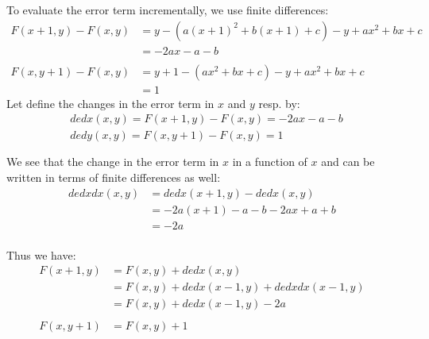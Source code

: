 \documentclass[a4paper,10pt]{article}
\begin{document}
\bigskip \noindent
To evaluate the error term incrementally, we use finite differences:
\begin{equation}
\left.\begin{aligned}
	F(x + 1, y) - F(x, y)
	&= y - (a(x + 1)^2 + b(x + 1) + c) - y + ax^2 + bx + c& \\
	&= -2ax - a - b& \\\\
	F(x, y + 1) - F(x, y)
	&= y + 1 - (ax^2 + bx + c) - y + ax^2 + bx + c& \\
	&= 1&
\end{aligned}\right.
\end{equation}
\newpage \noindent
Let define the changes in the error term in $x$ and $y$ resp. by:
\begin{equation}
\left.\begin{aligned}
	&dedx(x, y) = F(x + 1, y) - F(x, y) = -2ax - a - b& \\
	&dedy(x, y) = F(x, y + 1) - F(x, y) = 1& \\\\
\end{aligned}\right.
\end{equation}
We see that the change in the error term in $x$ in a function of $x$ and can be written in terms of finite differences as well:
\begin{equation}
\left.\begin{aligned}
	dedxdx(x, y) &= dedx(x + 1, y) - dedx(x, y)& \\
				 &= -2a(x + 1) - a - b - 2ax + a + b& \\
				 &= -2a&\\
\end{aligned}\right.
\end{equation}

\noindent
Thus we have:
\begin{equation}
\left.\begin{aligned}
	F(x + 1, y) &= F(x, y) + dedx(x, y)&\\
				&= F(x, y) + dedx(x - 1, y) + dedxdx(x - 1, y)& \\
				&= F(x, y) + dedx(x - 1, y) - 2a& \\\\
	F(x, y + 1) &= F(x, y) + 1& \\\\
\end{aligned}\right.
\end{equation}
\end{document}
